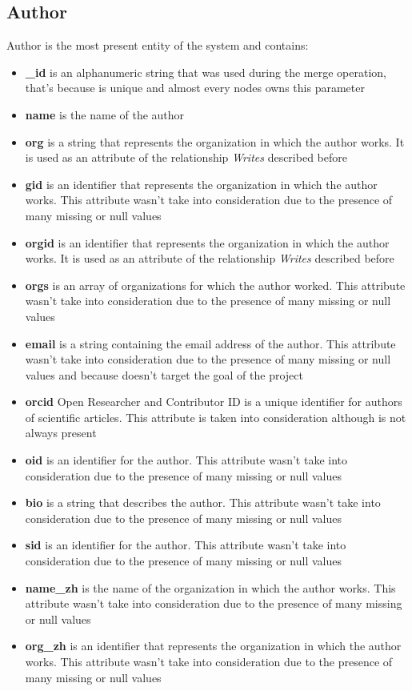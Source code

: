 \documentclass{Configuration_Files/PoliMi3i_thesis}
\begin{document}
\subsection{Author}
Author is the most present entity of the system and contains:
\begin{itemize}
    \item \textbf{\_id} is an alphanumeric string that was used during the merge operation, that's because is unique and
            almost every nodes owns this parameter
    \item \textbf{name} is the name of the author
    \item \textbf{org} is a string that represents the organization in which the author works. It is used as an attribute 
            of the relationship \emph{Writes} described before
    \item \textbf{gid} is an identifier that represents the organization in which the author works. This attribute wasn't
            take into consideration due to the presence of many missing or null values
    \item \textbf{orgid} is an identifier that represents the organization in which the author works. It is used as an 
            attribute of the relationship \emph{Writes} described before
    \item \textbf{orgs} is an array of organizations for which the author worked. This attribute wasn't take into 
            consideration due to the presence of many missing or null values
    \item \textbf{email} is a string containing the email address of the author. This attribute wasn't take into
            consideration due to the presence of many missing or null values and because doesn't target the goal of the 
            project
    \item \textbf{orcid} Open Researcher and Contributor ID is a unique identifier for authors of scientific articles.
            This attribute is taken into consideration although is not always present
    \item \textbf{oid} is an identifier for the author. This attribute wasn't take into consideration due to the
            presence of many missing or null values
    \item \textbf{bio} is a string that describes the author. This attribute wasn't take into consideration due to 
            the presence of many missing or null values   
    \item \textbf{sid} is an identifier for the author. This attribute wasn't take into consideration due to the
            presence of many missing or null values
    \item \textbf{name\_zh} is the name of the organization in which the author works. This attribute wasn't take
            into consideration due to the presence of many missing or null values
    \item \textbf{org\_zh} is an identifier that represents the organization in which the author works. This attribute
            wasn't take into consideration due to the presence of many missing or null values
\end{itemize}
\bigskip
\end{document}
